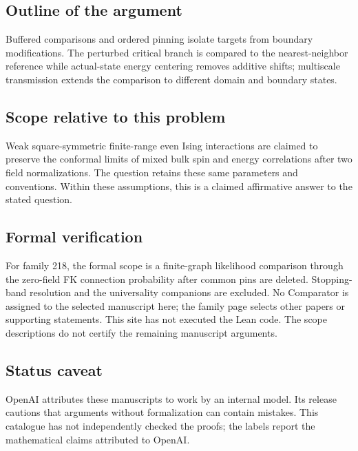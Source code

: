 \documentclass[11pt]{article}
\begin{document}
\subsection{Outline of the argument}
Buffered comparisons and ordered pinning isolate targets from boundary modifications. The perturbed critical branch is compared to the nearest-neighbor reference while actual-state energy centering removes additive shifts; multiscale transmission extends the comparison to different domain and boundary states.

\subsection{Scope relative to this problem}
Weak square-symmetric finite-range even Ising interactions are claimed to preserve the conformal limits of mixed bulk spin and energy correlations after two field normalizations. The question retains these same parameters and conventions. Within these assumptions, this is a claimed affirmative answer to the stated question.

\subsection{Formal verification}
For family 218, the formal scope is a finite-graph likelihood comparison through the zero-field FK connection probability after common pins are deleted. Stopping-band resolution and the universality companions are excluded. No Comparator is assigned to the selected manuscript here; the family page selects other papers or supporting statements. This site has not executed the Lean code. The scope descriptions do not certify the remaining manuscript arguments.

\subsection{Status caveat}
OpenAI attributes these manuscripts to work by an internal model. Its release cautions that arguments without formalization can contain mistakes. This catalogue has not independently checked the proofs; the labels report the mathematical claims attributed to OpenAI.
\end{document}
